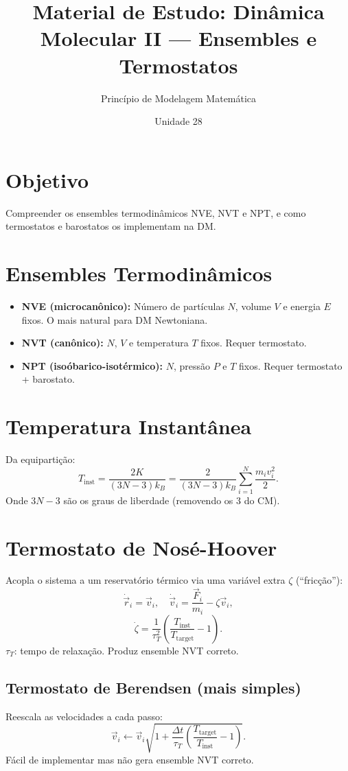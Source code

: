 \documentclass[12pt,a4paper]{article}
\title{Material de Estudo: Din\^amica Molecular II --- Ensembles e Termostatos}
\author{Princ\'ipio de Modelagem Matem\'atica}
\date{Unidade 28}
\begin{document}
\maketitle

\section*{Objetivo}
Compreender os ensembles termodin\^amicos NVE, NVT e NPT, e como termostatos e barostatos os implementam na DM.

\section*{Ensembles Termodin\^amicos}

\begin{itemize}
  \item \textbf{NVE (microcan\^onico):} N\'umero de part\'iculas $N$, volume $V$ e energia $E$ fixos. O mais natural para DM Newtoniana.
  \item \textbf{NVT (can\^onico):} $N$, $V$ e temperatura $T$ fixos. Requer termostato.
  \item \textbf{NPT (iso\'obarico-isot\'ermico):} $N$, press\~ao $P$ e $T$ fixos. Requer termostato + barostato.
\end{itemize}

\section*{Temperatura Instant\^anea}

Da equiparti\c{c}\~ao:
\[
T_\text{inst} = \frac{2K}{(3N-3)k_B} = \frac{2}{(3N-3)k_B}\sum_{i=1}^N \frac{m_iv_i^2}{2}.
\]
Onde $3N-3$ s\~ao os graus de liberdade (removendo os 3 do CM).

\section*{Termostato de Nos\'e-Hoover}

Acopla o sistema a um reservat\'orio t\'ermico via uma vari\'avel extra $\zeta$ (``fric\c{c}\~ao''):
\[
\dot{\vec{r}}_i = \vec{v}_i, \quad \dot{\vec{v}}_i = \frac{\vec{F}_i}{m_i} - \zeta\vec{v}_i,
\]
\[
\dot\zeta = \frac{1}{\tau_T^2}\left(\frac{T_\text{inst}}{T_\text{target}} - 1\right).
\]
$\tau_T$: tempo de relaxa\c{c}\~ao. Produz ensemble NVT correto.

\subsection*{Termostato de Berendsen (mais simples)}
Reescala as velocidades a cada passo:
\[
\vec{v}_i \leftarrow \vec{v}_i\sqrt{1 + \frac{\Delta t}{\tau_T}\!\left(\frac{T_\text{target}}{T_\text{inst}} - 1\right)}.
\]
F\'acil de implementar mas n\~ao gera ensemble NVT correto.
\end{document}
